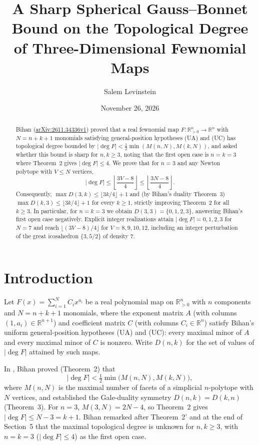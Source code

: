 \documentclass[11pt]{article}
\title{A Sharp Spherical Gauss--Bonnet Bound on the Topological Degree of Three-Dimensional Fewnomial Maps}
\author{Salem Levinstein}
\date{November 26, 2026}
\begin{document}
\maketitle

\begin{abstract}
Bihan (\href{https://arxiv.org/abs/2611.34336}{arXiv:2611.34336v1}) proved that a real fewnomial map $F:\mathbb{R}_{>0}^n\to\mathbb{R}^n$ with $N=n+k+1$ monomials satisfying general-position hypotheses \textup{(UA)} and \textup{(UC)} has topological degree bounded by $|\deg F| < \frac{1}{2}\min(M(n,N),M(k,N))$, and asked whether this bound is sharp for $n,k\ge 3$, noting that the first open case is $n=k=3$ where Theorem~2 gives $|\deg F|\le 4$. We prove that for $n=3$ and any Newton polytope with $V\le N$ vertices,
\[
|\deg F| \le \left\lfloor \frac{3V-8}{4} \right\rfloor \le \left\lfloor \frac{3N-8}{4} \right\rfloor.
\]
Consequently, $\max D(3,k) \le \lfloor 3k/4\rfloor + 1$ and (by Bihan's duality Theorem~3) $\max D(k,3) \le \lfloor 3k/4\rfloor + 1$ for every $k\ge 1$, strictly improving Theorem~2 for all $k\ge 3$. In particular, for $n=k=3$ we obtain $D(3,3) = \{0,1,2,3\}$, answering Bihan's first open case negatively. Explicit integer realizations attain $|\deg F|=0,1,2,3$ for $N=7$ and reach $\lfloor (3V-8)/4\rfloor$ for $V=8,9,10,12$, including an integer perturbation of the great icosahedron $\{3,5/2\}$ of density $7$.
\end{abstract}

\section{Introduction}
Let $F(x)=\sum_{i=1}^N C_i x^{a_i}$ be a real polynomial map on $\mathbb{R}_{>0}^n$ with $n$ components and $N=n+k+1$ monomials, where the exponent matrix $A$ (with columns $(1,a_i)\in\mathbb{R}^{n+1}$) and coefficient matrix $C$ (with columns $C_i\in\mathbb{R}^n$) satisfy Bihan's uniform general-position hypotheses \textup{(UA)} and \textup{(UC)}: every maximal minor of $A$ and every maximal minor of $C$ is nonzero. Write $D(n,k)$ for the set of values of $|\deg F|$ attained by such maps.

In \cite{Bihan2026}, Bihan proved (Theorem~2) that
\[
|\deg F| < \tfrac{1}{2}\min\bigl(M(n,N), M(k,N)\bigr),
\]
where $M(n,N)$ is the maximal number of facets of a simplicial $n$-polytope with $N$ vertices, and established the Gale-duality symmetry $D(n,k)=D(k,n)$ (Theorem~3). For $n=3$, $M(3,N)=2N-4$, so Theorem~2 gives $|\deg F|\le N-3=k+1$. Bihan remarked after Theorem~2' and at the end of Section~5 that the maximal topological degree is unknown for $n,k\ge 3$, with $n=k=3$ ($|\deg F|\le 4$) as the first open case.
\end{document}
